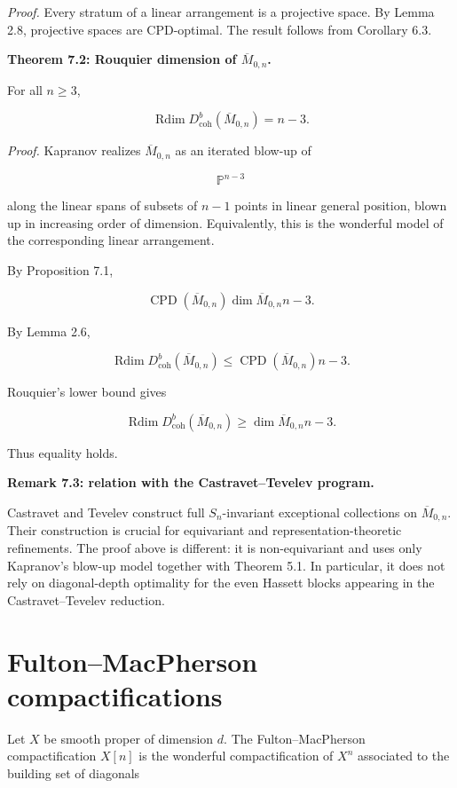 \documentclass[11pt]{amsart}
\theoremstyle{definition}
\begin{document}
\noindent\emph{Proof.} Every stratum of a linear arrangement is a projective space. By Lemma 2.8, projective spaces are CPD-optimal. The result follows from Corollary 6.3.

\noindent\textbf{Theorem 7.2: Rouquier dimension of $\overline M_{0,n}$.}

For all $n\ge3$,

\[
\operatorname{Rdim}D^b_{\mathrm{coh}}(\overline M_{0,n})=n-3.
\]

\noindent\emph{Proof.} Kapranov realizes $\overline M_{0,n}$ as an iterated blow-up of

\[
\mathbb P^{n-3}
\]

along the linear spans of subsets of $n-1$ points in linear general position, blown up in increasing order of dimension. Equivalently, this is the wonderful model of the corresponding linear arrangement.

By Proposition 7.1,

\[
\operatorname{CPD}(\overline M_{0,n})
\dim \overline M_{0,n}
n-3.
\]

By Lemma 2.6,

\[
\operatorname{Rdim}D^b_{\mathrm{coh}}(\overline M_{0,n})
\le
\operatorname{CPD}(\overline M_{0,n})
n-3.
\]

Rouquier's lower bound gives

\[
\operatorname{Rdim}D^b_{\mathrm{coh}}(\overline M_{0,n})
\ge
\dim \overline M_{0,n}
n-3.
\]

Thus equality holds.

\noindent\textbf{Remark 7.3: relation with the Castravet--Tevelev program.}

Castravet and Tevelev construct full $S_n$-invariant exceptional collections on $\overline M_{0,n}$. Their construction is crucial for equivariant and representation-theoretic refinements. The proof above is different: it is non-equivariant and uses only Kapranov's blow-up model together with Theorem 5.1. In particular, it does not rely on diagonal-depth optimality for the even Hassett blocks appearing in the Castravet--Tevelev reduction.

\section{Fulton--MacPherson compactifications}

Let $X$ be smooth proper of dimension $d$. The Fulton--MacPherson compactification $X[n]$ is the wonderful compactification of $X^n$ associated to the building set of diagonals
\end{document}
